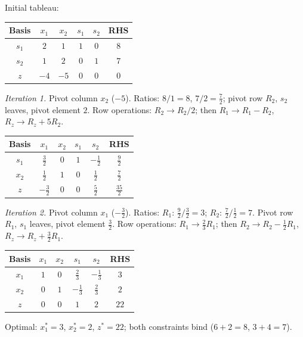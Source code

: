 \begin{solutions}
  \item Initial tableau:
        \begin{center}
        \begin{tabular}{c|cccc|c}
        Basis & $x_1$ & $x_2$ & $s_1$ & $s_2$ & RHS\\
        \hline
        $s_1$ & $2$ & $1$ & $1$ & $0$ & $8$\\
        $s_2$ & $1$ & $2$ & $0$ & $1$ & $7$\\
        \hline
        $z$ & $-4$ & $-5$ & $0$ & $0$ & $0$\\
        \end{tabular}
        \end{center}
        \emph{Iteration 1.} Pivot column $x_2$ ($-5$). Ratios: $8/1=8$,
        $7/2=\tfrac{7}{2}$; pivot row $R_2$, $s_2$ leaves, pivot element
        $2$. Row operations: $R_2\to R_2/2$; then $R_1\to R_1-R_2$,
        $R_z\to R_z+5R_2$.
        \begin{center}
        \begin{tabular}{c|cccc|c}
        Basis & $x_1$ & $x_2$ & $s_1$ & $s_2$ & RHS\\
        \hline
        $s_1$ & $\tfrac{3}{2}$ & $0$ & $1$ & $-\tfrac{1}{2}$ & $\tfrac{9}{2}$\\
        $x_2$ & $\tfrac{1}{2}$ & $1$ & $0$ & $\tfrac{1}{2}$ & $\tfrac{7}{2}$\\
        \hline
        $z$ & $-\tfrac{3}{2}$ & $0$ & $0$ & $\tfrac{5}{2}$ & $\tfrac{35}{2}$\\
        \end{tabular}
        \end{center}
        \emph{Iteration 2.} Pivot column $x_1$ ($-\tfrac{3}{2}$).
        Ratios: $R_1$: $\tfrac{9}{2}\big/\tfrac{3}{2}=3$; $R_2$:
        $\tfrac{7}{2}\big/\tfrac{1}{2}=7$. Pivot row $R_1$, $s_1$
        leaves, pivot element $\tfrac{3}{2}$. Row operations:
        $R_1\to \tfrac{2}{3}R_1$; then $R_2\to R_2-\tfrac{1}{2}R_1$,
        $R_z\to R_z+\tfrac{3}{2}R_1$.
        \begin{center}
        \begin{tabular}{c|cccc|c}
        Basis & $x_1$ & $x_2$ & $s_1$ & $s_2$ & RHS\\
        \hline
        $x_1$ & $1$ & $0$ & $\tfrac{2}{3}$ & $-\tfrac{1}{3}$ & $3$\\
        $x_2$ & $0$ & $1$ & $-\tfrac{1}{3}$ & $\tfrac{2}{3}$ & $2$\\
        \hline
        $z$ & $0$ & $0$ & $1$ & $2$ & $22$\\
        \end{tabular}
        \end{center}
        Optimal: $x_1^{*}=3$, $x_2^{*}=2$, $z^{*}=22$; both constraints
        bind ($6+2=8$, $3+4=7$).


\end{solutions}
